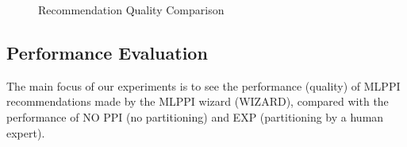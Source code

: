 \documentclass[runningheads]{comsis2}
\begin{document}
\begin{figure}[t]
\vspace{-.2in}
\centering
{}
\vspace{-0.1in}
\caption{Recommendation Quality Comparison\label{fig:recomm_qual}}
\vspace{-.1in}
\end{figure}

\subsection{Performance Evaluation}

The main focus of our experiments is to see the performance (quality) 
of MLPPI recommendations made by the MLPPI wizard (WIZARD), 
compared with the performance of NO PPI (no partitioning) and EXP (partitioning 
by a human expert). 
\end{document}
